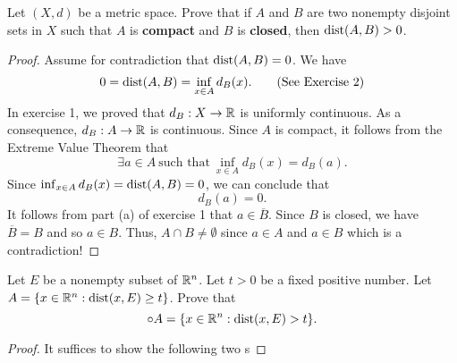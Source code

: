 \documentclass[a4paper]{article}
\begin{document}
\begin{problem}
    Let \( (X,d) \) be a metric space. Prove that if \( A  \) and \( B  \) are two nonempty disjoint sets in \( X  \) such that \( A  \) is \textbf{compact} and \( B  \) is \textbf{closed}, then \( \operatorname{dist}(A,B) > 0  \).
\end{problem}
\begin{proof}
Assume for contradiction that \( \operatorname{dist}(A,B) = 0  \). We have 
\[  0 = \operatorname{dist}(A,B) = \inf_{x \in A} {d}_{B}(x). \tag{See Exercise 2} \]
In exercise 1, we proved that \( {d}_{B}: X \to \mathbb{R}  \) is uniformly continuous. As a consequence, \( {d}_{B} : A \to \mathbb{R}  \) is continuous. Since \( A  \) is compact, it follows from the Extreme Value Theorem that 
\[  \exists a \in A \ \text{such that} \ \inf_{x \in A } {d}_{B}(x) = {d}_{B}(a). \]
Since \( \inf_{x \in A } {d}_{B}(x) = \operatorname{dist}(A,B) = 0  \), we can conclude that 
\[  {d}_{B}(a) = 0.  \] 
It follows from part (a) of exercise 1 that \( a \in \overline{B} \). Since \( B  \) is closed, we have \( \overline{B} = B  \) and so \( a \in B  \). Thus, \( A \cap B \neq \emptyset  \) since \( a \in A  \) and \( a \in B  \) which is a contradiction!
\end{proof}

\begin{problem}
    Let \( E  \) be a nonempty subset of \( \mathbb{R}^{n} \). Let \( t > 0  \) be a fixed positive number. Let \( A = \{  x \in \mathbb{R}^{n} :  \operatorname{dist}(x,E) \geq t  \}  \). Prove that 
    \[  \circ{A} = \{ x \in \mathbb{R}^{n} : \operatorname{dist}(x,E) > t  \}. \]
\end{problem}
\begin{proof}
It suffices to show the following two s
\end{proof}
\end{document}
